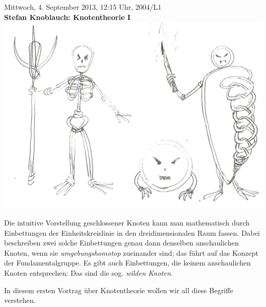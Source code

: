 \documentclass[a4paper,ngerman,landscape]{scrartcl}
\begin{document}
\begin{center}
  \Huge
  Mittwoch, 4. September 2013, 12:15 Uhr, 2004/L1 \\
  \textbf{Stefan Knoblauch: Knotentheorie I}
  \vfill
  \includegraphics[scale=0.9]{knotenarmee-einfach}
  \vfill

  \Large
  \begin{minipage}{0.91\textwidth}
    \setlength\parskip{\medskipamount}
    Die intuitive Vorstellung geschlossener Knoten kann man mathematisch durch
    Einbettungen der Einheitskreislinie in den dreidimensionalen Raum fassen.
    Dabei beschreiben zwei solche Einbettungen genau dann denselben
    anschaulichen Knoten, wenn sie \emph{umgebungshomotop} zueinander sind; das führt
    auf das Konzept der Fundamentalgruppe. Es gibt auch Einbettungen, die
    keinem anschaulichen Knoten entsprechen: Das sind die sog. \emph{wilden
    Knoten}.

    In diesem ersten Vortrag über Knotentheorie wollen wir all diese Begriffe
    verstehen.
  \end{minipage}
\end{center}
\end{document}
